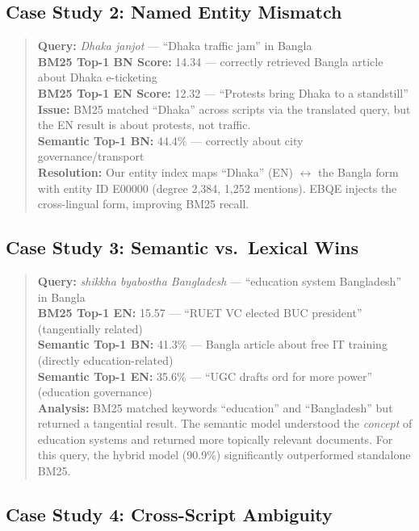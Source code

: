 \documentclass[12pt,a4paper]{article}
\newcommand{\bn}[1]{\textit{#1}}
\begin{document}
\subsection{Case Study 2: Named Entity Mismatch}

\begin{quote}
\textbf{Query:} \bn{Dhaka janjot} --- ``Dhaka traffic jam'' in Bangla\\
\textbf{BM25 Top-1 BN Score:} 14.34 --- correctly retrieved Bangla article about Dhaka e-ticketing\\
\textbf{BM25 Top-1 EN Score:} 12.32 --- ``Protests bring Dhaka to a standstill''\\
\textbf{Issue:} BM25 matched ``Dhaka'' across scripts via the translated query, but the EN result is about protests, not traffic.\\
\textbf{Semantic Top-1 BN:} 44.4\% --- correctly about city governance/transport\\
\textbf{Resolution:} Our entity index maps ``Dhaka'' (EN) $\leftrightarrow$ the Bangla form with entity ID E00000 (degree 2{,}384, 1{,}252 mentions). EBQE injects the cross-lingual form, improving BM25 recall.
\end{quote}

\subsection{Case Study 3: Semantic vs.\ Lexical Wins}

\begin{quote}
\textbf{Query:} \bn{shikkha byabostha Bangladesh} --- ``education system Bangladesh'' in Bangla\\
\textbf{BM25 Top-1 EN:} 15.57 --- ``RUET VC elected BUC president'' (tangentially related)\\
\textbf{Semantic Top-1 BN:} 41.3\% --- Bangla article about free IT training (directly education-related)\\
\textbf{Semantic Top-1 EN:} 35.6\% --- ``UGC drafts ord for more power'' (education governance)\\
\textbf{Analysis:} BM25 matched keywords ``education'' and ``Bangladesh'' but returned a tangential result. The semantic model understood the \textit{concept} of education systems and returned more topically relevant documents. For this query, the hybrid model (90.9\%) significantly outperformed standalone BM25.
\end{quote}

\subsection{Case Study 4: Cross-Script Ambiguity}
\end{document}
